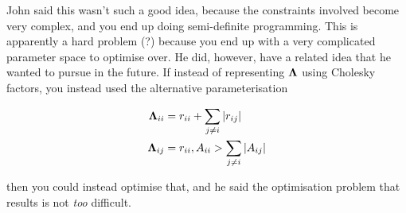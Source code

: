 \documentclass{article}[12pt]
\begin{document}
\noindent John said this wasn't such a good idea, because the constraints involved become very
complex, and you end up doing semi-definite programming. This is apparently a hard problem (?)
because you end up with a very complicated parameter space to optimise over. He did, however, have a
related idea that he wanted to pursue in the future. If instead of representing ${\boldsymbol \Lambda}$ using
Cholesky factors, you instead used the alternative parameterisation

\begin{align*}
	{\boldsymbol\Lambda}_{ii} &= r_{ii} + \sum_{j \ne i} |r_{ij}| \\
	{\boldsymbol \Lambda}_{ij} &= r_{ii}, A_{ii} > \sum_{j \ne i} |A_{ij}|
\end{align*}

\noindent then you could instead optimise that, and he said the optimisation problem that results is
not \emph{too} difficult.
\end{document}

